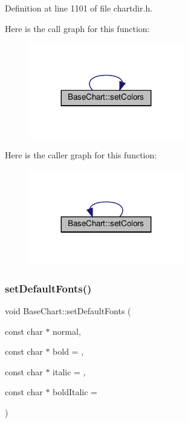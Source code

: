 Definition at line 1101 of file chartdir.\+h.

Here is the call graph for this function\+:
\nopagebreak
\begin{figure}[H]
\begin{center}
\leavevmode
\includegraphics[width=191pt]{class_base_chart_a9f8769cbd1e4c964d154303765d2bd8e_cgraph}
\end{center}
\end{figure}
Here is the caller graph for this function\+:
\nopagebreak
\begin{figure}[H]
\begin{center}
\leavevmode
\includegraphics[width=191pt]{class_base_chart_a9f8769cbd1e4c964d154303765d2bd8e_icgraph}
\end{center}
\end{figure}
\mbox{\label{class_base_chart_a972253c28223ba0f9811657fa783a674}} 
\subsubsection{\texorpdfstring{set\+Default\+Fonts()}{setDefaultFonts()}}
{\footnotesize\ttfamily void Base\+Chart\+::set\+Default\+Fonts (\begin{DoxyParamCaption}\item[{const char $\ast$}]{normal,  }\item[{const char $\ast$}]{bold = {},  }\item[{const char $\ast$}]{italic = {},  }\item[{const char $\ast$}]{bold\+Italic = {} }\end{DoxyParamCaption})\hspace{0.3cm}{\ttfamily [inline]}}




